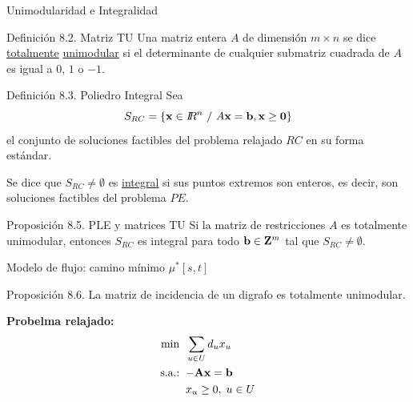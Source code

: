 \documentclass[aspectratio=169]{beamer}
\begin{document}
\begin{frame}{Unimodularidad e Integralidad}


\begin{block}{Definición 8.2. Matriz TU}
	Una matriz entera $A$ de dimensi\'{o}n $m
	\times n$ se dice \underline{totalmente} \underline{unimodular} si el
	determinante de cualquier submatriz cuadrada de $A$ es igual a $0$,
	$1$ o $-1$.
\end{block}

\begin{block}{Definición 8.3. Poliedro Integral}
Sea $$ S_{RC} = \left\{ {\bf x} \in I \! \! R^n \ / \ A {\bf x} =
{\bf b}, {\bf x} \geq {\bf 0} \right\} $$ el conjunto  de soluciones
factibles del problema relajado $RC$ en su forma est\'{a}ndar.

Se dice que $S_{RC}\neq \emptyset$ es
	\underline{integral} si sus puntos extremos son enteros, es decir,
	son soluciones factibles del problema $PE$.
\end{block}


\begin{block}{Proposición 8.5. PLE y matrices TU}
	Si la matriz de restricciones $A$ es
	totalmente unimodular, entonces $S_{RC}$ es integral para todo ${\bf
		b} \in \mathbf{Z}^m$ tal que $ S_{RC} \neq \emptyset$.
\end{block}

\end{frame}


\begin{frame}{Modelo de flujo: camino mínimo $\mu^*[s,t]$}

\begin{block}{Proposición 8.6.}
	La matriz de incidencia de un digrafo es totalmente unimodular.
\end{block}
	
	\textbf{Probelma relajado:}
	\begin{align*}
		\min\;\;     & \sum_{u\in U} d_u x_{u} \\
		\textrm{s.a.:\;\;} &   {\bf -A x}={\bf b} \\
		&   x_{u} \geq 0, \; u\in U
	\end{align*}

\end{frame}
\end{document}
